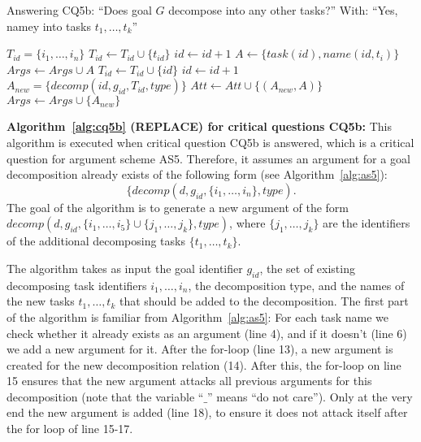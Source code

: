 \begin{algorithm}[h]
  \caption{Answering CQ5b: ``Does goal $G$ decompose into any other tasks?'' With: ``Yes, namey into tasks $t_1,\ldots,t_k$''}\label{alg:cq5b}
  \begin{algorithmic}[1]
    \State $T_{id} = \{i_1,\ldots,i_n\}$
    \label{alg:cq5b:for1}
        \State $T_{id} \gets T_{id} \cup \{t_{id}\}$
      \Else
        \State $id\gets id+1$
        \State $A \gets \{task(id),name(id,t_i)\}$
        \State $Args \gets Args\cup A$
        \State $T_{id} \gets T_{id} \cup \{id\}$
      \EndIf
    \EndFor
    \State $id\gets id+1$
    \State $A_{new} = \{decomp(id, g_{id}, T_{id}, type)\}$\label{alg:cq5b:newarg}
    \label{alg:cq5b:for2}
      \State $Att\gets Att \cup \{(A_{new},A)\}$
    \EndFor
    \State $Args \gets Args \cup \{A_{new}\}$
    \EndProcedure
  \end{algorithmic}
\end{algorithm}

\noindent\textbf{Algorithm~\ref{alg:cq5b} (\textsf{REPLACE}) for critical questions CQ5b:}  This algorithm is executed when critical question CQ5b is answered, which is a critical question for argument scheme AS5. Therefore, it assumes an argument for a goal decomposition already exists of the following form (see Algorithm~\ref{alg:as5}): $$\{decomp(d, g_{id}, \{i_1,\ldots,i_n\},type).$$  The goal of the algorithm is to generate a new argument of the form $decomp(d, g_{id}, \{i_1,\ldots,i_5\}\cup \{j_1,\ldots,j_k\}, type)$, where $\{j_1,\ldots,j_k\}$ are the identifiers of the additional decomposing tasks $\{t_1,\ldots,t_k\}$.

The algorithm takes as input the goal identifier $g_{id}$, the set of existing decomposing task identifiers $i_1,\ldots,i_n$, the decomposition type, and the names of the new tasks $t_1,\ldots,t_k$ that should be added to the decomposition. The first part of the algorithm is familiar from Algorithm~\ref{alg:as5}: For each task name we check whether it already exists as an argument (line 4), and if it doesn't (line 6) we add a new argument for it. After the for-loop (line 13), a new argument is created for the new decomposition relation (14). After this, the for-loop on line 15 ensures that the new argument attacks all previous arguments for this decomposition (note that the variable ``$\_$'' means ``do not care''). Only at the very end the new argument is added (line 18), to ensure it does not attack itself after the for loop of line 15-17. 

